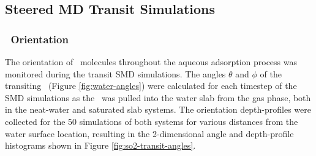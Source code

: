 \documentclass{article}
\begin{document}
\subsection{Steered MD Transit Simulations}

\subsubsection {\suldiox~Orientation}

	The orientation of \suldiox~molecules throughout the aqueous adsorption process was monitored during the transit SMD simulations. The angles $\theta$ and $\phi$ of the transiting \suldiox~(Figure \ref{fig:water-angles}) were calculated for each timestep of the SMD simulations as the \suldiox~was pulled into the water slab from the gas phase, both in the neat-water and saturated slab systems. The orientation depth-profiles were collected for the 50 simulations of both systems for various distances from the water surface location, resulting in the 2-dimensional angle and depth-profile histograms shown in Figure \ref{fig:so2-transit-angles}.
\end{document}
